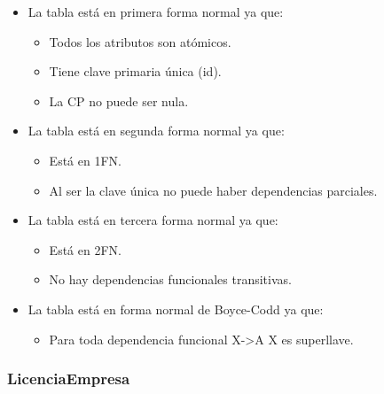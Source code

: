 \documentclass[12pt,a4paperpaper,]{report}
\providecommand{\tightlist}{%
  \setlength{\itemsep}{0pt}\setlength{\parskip}{0pt}}
\begin{document}
\begin{itemize}
\tightlist
\item
  La tabla está en primera forma normal ya que:

  \begin{itemize}
  \tightlist
  \item
    Todos los atributos son atómicos.
  \item
    Tiene clave primaria única (id).
  \item
    La CP no puede ser nula.
  \end{itemize}
\item
  La tabla está en segunda forma normal ya que:

  \begin{itemize}
  \tightlist
  \item
    Está en 1FN.
  \item
    Al ser la clave única no puede haber dependencias parciales.
  \end{itemize}
\item
  La tabla está en tercera forma normal ya que:

  \begin{itemize}
  \tightlist
  \item
    Está en 2FN.
  \item
    No hay dependencias funcionales transitivas.
  \end{itemize}
\item
  La tabla está en forma normal de Boyce-Codd ya que:

  \begin{itemize}
  \tightlist
  \item
    Para toda dependencia funcional X-\textgreater{}A X es superllave.
  \end{itemize}
\end{itemize}

\subsubsection{LicenciaEmpresa}\label{licenciaempresa}
\end{document}
